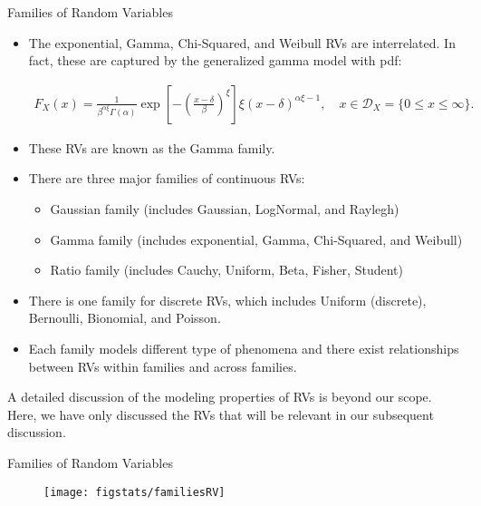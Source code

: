 \documentclass[9pt]{beamer}
\begin{document}
%
\begin{frame}{Families of Random Variables}
\begin{itemize}

\item The exponential, Gamma, Chi-Squared, and Weibull RVs are interrelated. In fact, these are captured by the generalized gamma model with pdf:
\begin{block}{}
\begin{align*}
F_X(x)=\frac{1}{\beta^{\alpha\xi}\Gamma(\alpha)}\exp\left[-\left(\frac{x-\delta}{\beta}\right)^\xi\right]\xi(x-\delta)^{\alpha\xi-1},\quad x\in \mathcal{D}_X=\{0\leq x\leq \infty\}.
\end{align*}
\end{block}
\item These RVs are known as the Gamma family. 
\item There are three major families of continuous RVs: 
\begin{itemize}
\item Gaussian family (includes Gaussian, LogNormal, and Raylegh)
\item Gamma family (includes exponential, Gamma, Chi-Squared, and Weibull)
\item Ratio family (includes Cauchy, Uniform, Beta, Fisher, Student)
\end{itemize}

\item There is one family for discrete RVs, which includes Uniform (discrete), Bernoulli, Bionomial, and Poisson.

\item Each family models different type of phenomena and there exist relationships between RVs within families and across families. 

\end{itemize}
A detailed discussion of the modeling properties of RVs is beyond our scope. Here, we have only discussed the RVs that will be relevant in our subsequent discussion. 

\end{frame}

%
\begin{frame}{Families of Random Variables}

\begin{figure}[!htb]
    \centering
	\texttt{[image: figstats/familiesRV]}
\end{figure}

\end{frame}
\end{document}
